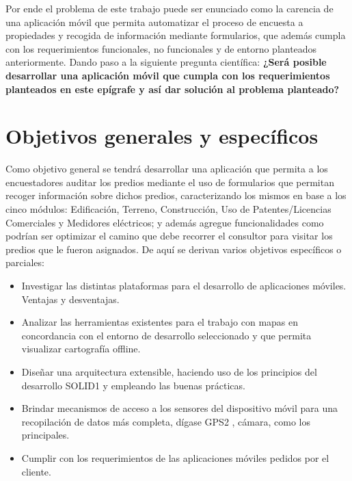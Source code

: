 Por ende el problema de este trabajo puede ser enunciado como la carencia de una
aplicación móvil que permita automatizar el proceso de encuesta a propiedades y
recogida de información mediante formularios, que además cumpla con los
requerimientos funcionales, no funcionales y de entorno planteados anteriormente.
Dando paso a la siguiente pregunta científica:
\textbf{¿Será posible desarrollar una aplicación móvil que cumpla con los requerimientos
    planteados en este epígrafe y así dar solución al problema planteado?}




\section{Objetivos generales y específicos}
Como objetivo general se tendrá desarrollar una aplicación que permita a los
encuestadores auditar los predios mediante el uso de formularios que permitan
recoger información sobre dichos predios, caracterizando los mismos en base a los
cinco módulos: Edificación, Terreno, Construcción, Uso de Patentes/Licencias
Comerciales y Medidores eléctricos; y además agregue funcionalidades como
podrían ser optimizar el camino que debe recorrer el consultor para visitar los
predios que le fueron asignados. De aquí se derivan varios objetivos específicos o
parciales:
\begin{itemize}
    \item Investigar las distintas plataformas para el desarrollo de aplicaciones móviles.
          Ventajas y desventajas.
    \item Analizar las herramientas existentes para el trabajo con mapas en
          concordancia con el entorno de desarrollo seleccionado y que permita
          visualizar cartografía offline.
    \item Diseñar una arquitectura extensible, haciendo uso de los principios del
          desarrollo SOLID1 y empleando las buenas prácticas.
    \item Brindar mecanismos de acceso a los sensores del dispositivo móvil para una
          recopilación de datos más completa, dígase GPS2
          , cámara, como los
          principales.
    \item Cumplir con los requerimientos de las aplicaciones móviles pedidos por el
          cliente.
\end{itemize}

